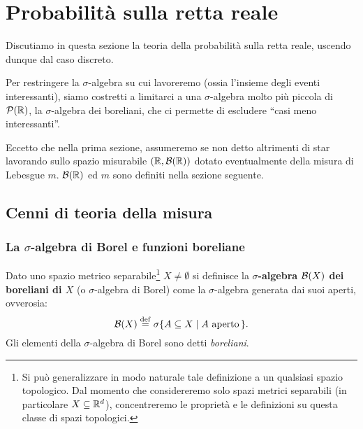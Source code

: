 \chapter{Probabilità sulla retta reale}
\setlength{\parindent}{2pt}

\begin{multicols*}{2}

Discutiamo in questa sezione la teoria della probabilità sulla
retta reale, uscendo dunque dal caso discreto. \smallskip

Per restringere la $\sigma$-algebra su cui lavoreremo (ossia l'insieme degli
eventi interessanti), siamo costretti a limitarci a una $\sigma$-algebra molto più
piccola di $\mathcal{P}(\mathbb{R})$, la $\sigma$-algebra dei boreliani, che ci permette di escludere
``casi meno interessanti''. \smallskip

\begin{warn}
    Eccetto che nella prima sezione, assumeremo se non detto altrimenti
    di star lavorando sullo spazio misurabile
    $(\mathbb{R}, \mathcal{B}(\mathbb{R}))$ dotato eventualmente della misura di Lebesgue $m$. $\mathcal{B}(\mathbb{R})$ ed
    $m$ sono definiti nella sezione seguente.
\end{warn} 

\section{Cenni di teoria della misura}

\subsection{La \texorpdfstring{$\sigma$}{σ}-algebra di Borel e funzioni boreliane}

\begin{definition}
    Dato uno spazio metrico separabile\footnote{
        Si può generalizzare in modo naturale tale definizione a un qualsiasi spazio topologico.
        Dal momento che considereremo solo spazi metrici separabili (in particolare $X \subseteq \mathbb{R}^d$), concentreremo
        le proprietà e le definizioni su questa classe di spazi topologici.} $X \neq \emptyset$
    si definisce la \textbf{$\sigma$-algebra $\mathcal{B}(X)$ dei boreliani di $X$} (o
    $\sigma$-algebra di Borel)
    come la $\sigma$-algebra generata dai suoi aperti, ovverosia:
    \[
        \mathcal{B}(X) \overset{\mathrm{def}}{=} \sigma \{ A \subseteq X \mid A \text{ aperto}\, \}.
    \]
    Gli elementi della $\sigma$-algebra di Borel sono detti \textit{boreliani}.
\end{definition}


\end{multicols*}
